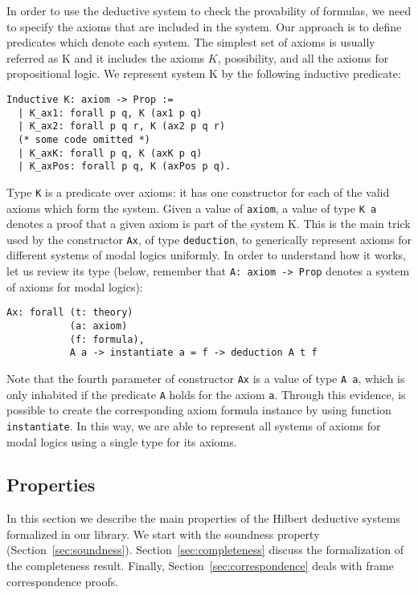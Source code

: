 \documentclass[3p,times]{elsarticle}
\begin{document}
In order to use the deductive system to
check the provability of formulas, we need to specify the axioms that are
included in the system. Our approach is to define predicates
which denote each system. The simplest set of axioms is usually referred as
K and it includes the axioms $K$, possibility,
and all the axioms for propositional logic. We represent system K
by the following inductive predicate:
\begin{verbatim}
Inductive K: axiom -> Prop :=
  | K_ax1: forall p q, K (ax1 p q)
  | K_ax2: forall p q r, K (ax2 p q r)
  (* some code omitted *)
  | K_axK: forall p q, K (axK p q)
  | K_axPos: forall p q, K (axPos p q).
\end{verbatim}
Type \texttt{K} is a predicate over axioms: it has one constructor for
each of the valid axioms which form the system. Given a value
of \texttt{axiom}, a value of type \texttt{K a} denotes a
proof that a given axiom is part of the system K. This is the main
trick used by the constructor \texttt{Ax}, of type
\texttt{deduction}, to generically represent axioms for
different systems of modal logics uniformly. In order to understand how it
works, let us review its type (below, remember that \texttt{A: axiom -> Prop}
denotes a system of axioms for modal logics):
\begin{verbatim}
Ax: forall (t: theory)
           (a: axiom)
           (f: formula),
           A a -> instantiate a = f -> deduction A t f
\end{verbatim}
Note that the fourth parameter of constructor \texttt{Ax} is a value
of type \texttt{A a}, which is only inhabited if the predicate
\texttt{A} holds for the axiom \texttt{a}. Through this
evidence, is possible to create the corresponding axiom formula instance by
using function \texttt{instantiate}. In this way, we are able to
represent all systems of axioms for modal logics using a single type
for its axioms.

\subsection{Properties}

In this section we describe the main properties of the Hilbert deductive systems formalized
in our library. We start with the soundness property (Section~\ref{sec:soundness}).
Section~\ref{sec:completeness} discuss the formalization of the completeness result. Finally,
Section~\ref{sec:correspondence} deals with frame correspondence proofs.
\end{document}
